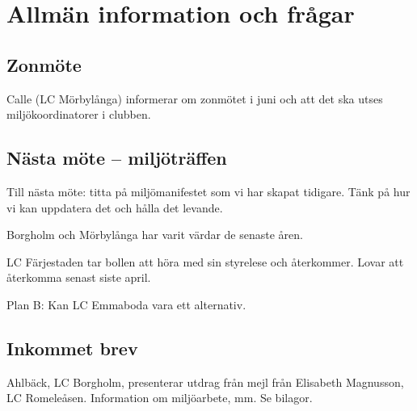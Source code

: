 \documentclass[12pt,a4paper]{article}
\begin{document}
\section{Allmän information och frågar}

\subsection{Zonmöte}
Calle (LC Mörbylånga) informerar om zonmötet i juni och att det ska utses miljökoordinatorer i clubben.

\subsection{Nästa möte -- miljöträffen}

Till nästa möte: titta på miljömanifestet som vi har skapat tidigare. Tänk på hur vi kan uppdatera det och hålla det levande.

Borgholm och Mörbylånga har varit värdar de senaste åren.

LC Färjestaden tar bollen att höra med sin styrelese och återkommer. Lovar att återkomma senast siste april.

Plan B: Kan LC Emmaboda vara ett alternativ. 

\subsection{Inkommet brev}
Ahlbäck, LC Borgholm, presenterar utdrag från mejl från Elisabeth Magnusson, LC Romeleåsen. Information om miljöarbete, mm. Se bilagor.
\end{document}
